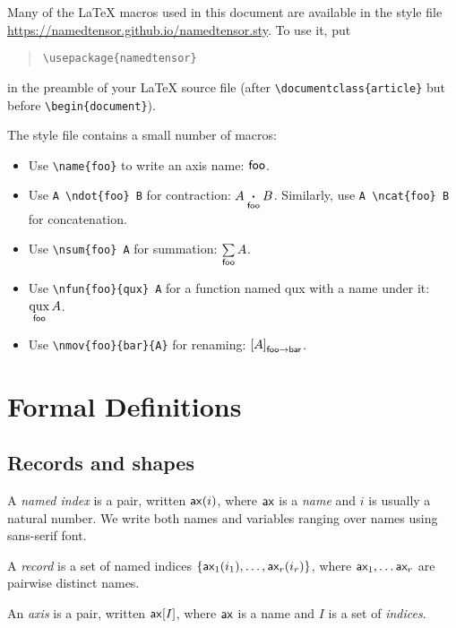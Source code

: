 \documentclass{article}
\begin{document}
Many of the \LaTeX{} macros used in this document are available in the style file \url{https://namedtensor.github.io/namedtensor.sty}. To use it, put
\begin{quote}
\begin{verbatim}
\usepackage{namedtensor}
\end{verbatim}
\end{quote}
in the preamble of your \LaTeX{} source file (after \verb|\documentclass{article}| but before \verb|\begin{document}|).

The style file contains a small number of macros:
\begin{itemize}
\item Use \verb|\name{foo}| to write an axis name: $\name{foo}$.
\item Use \verb|A \ndot{foo} B| for contraction: $A \ndot{foo} B$. Similarly, use \verb|A \ncat{foo} B| for concatenation.
\item Use \verb|\nsum{foo} A| for summation: $\nsum{foo} A$.
\item Use \verb|\nfun{foo}{qux} A| for a function named qux with a name under it: $\nfun{foo}{qux} A$.
\item Use \verb|\nmov{foo}{bar}{A}| for renaming: $\nmov{foo}{bar}{A}$.
\end{itemize}

\section{Formal Definitions}
\label{sec:definitions}

\newcommand{\sub}[1]{_\text{$#1$}}

\subsection{Records and shapes}

A \emph{named index} is a pair, written $\nidx{ax}{i}$, where $\name{ax}$ is a \emph{name} and $i$ is usually a natural number. We write both names and variables ranging over names using sans-serif font.

A \emph{record} is a set of named indices $\{\nidx{ax\sub{1}}{i_1}, \ldots, \nidx{ax\sub{r}}{i_r}\}$, where $\name{ax\sub{1}}, \ldots \name{ax\sub{r}}$ are pairwise distinct names. 

An \emph{axis} is a pair, written $\nset{ax}{I}$, where $\name{ax}$ is a name and $I$ is a set of \emph{indices}.
\end{document}
